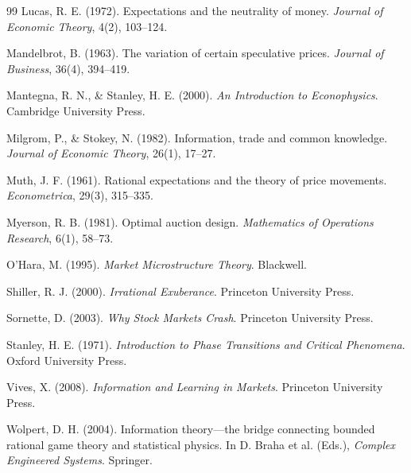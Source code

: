 \documentclass[12pt,a4paper]{article}
\theoremstyle{definition}
\begin{document}
\begin{thebibliography}{99}
Lucas, R. E. (1972). Expectations and the neutrality of money. \textit{Journal of Economic Theory}, 4(2), 103--124.

Mandelbrot, B. (1963). The variation of certain speculative prices. \textit{Journal of Business}, 36(4), 394--419.

Mantegna, R. N., \& Stanley, H. E. (2000). \textit{An Introduction to Econophysics}. Cambridge University Press.

Milgrom, P., \& Stokey, N. (1982). Information, trade and common knowledge. \textit{Journal of Economic Theory}, 26(1), 17--27.

Muth, J. F. (1961). Rational expectations and the theory of price movements. \textit{Econometrica}, 29(3), 315--335.

Myerson, R. B. (1981). Optimal auction design. \textit{Mathematics of Operations Research}, 6(1), 58--73.

O'Hara, M. (1995). \textit{Market Microstructure Theory}. Blackwell.

Shiller, R. J. (2000). \textit{Irrational Exuberance}. Princeton University Press.

Sornette, D. (2003). \textit{Why Stock Markets Crash}. Princeton University Press.

Stanley, H. E. (1971). \textit{Introduction to Phase Transitions and Critical Phenomena}. Oxford University Press.

Vives, X. (2008). \textit{Information and Learning in Markets}. Princeton University Press.

Wolpert, D. H. (2004). Information theory---the bridge connecting bounded rational game theory and statistical physics. In D. Braha et al. (Eds.), \textit{Complex Engineered Systems}. Springer.

\end{thebibliography}
\end{document}
